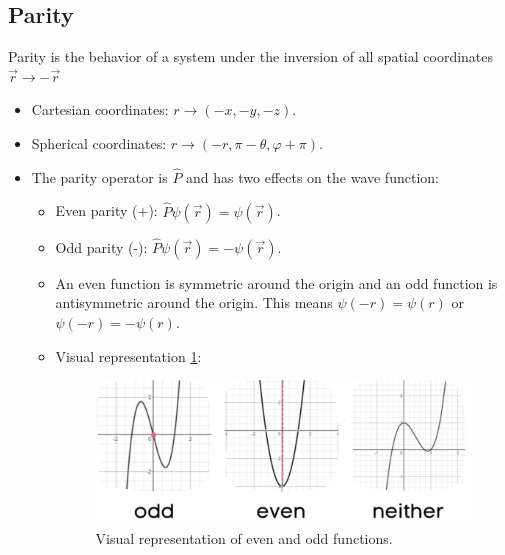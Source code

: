 \subsection{Parity}
Parity is the behavior of a system under the inversion of all spatial coordinates $\vec{r} → - \vec{r}$
\begin{itemize}
    \item Cartesian coordinates: $r → (-x, -y, -z)$. 
    \item Spherical coordinates: $r → (-r, π-θ, φ + π)$.
    \item The parity operator is $\hat{P}$ and has two effects on the wave function: 
    \begin{itemize}
        \item Even parity (+): $\hat{P}ψ(\vec{r}) = ψ(\vec{r})$.
        \item Odd parity (-): $\hat{P}ψ(\vec{r}) = -ψ(\vec{r})$.
        \item An even function is symmetric around the origin and an odd function is antisymmetric around the origin. This means $ψ(-r) = ψ(r)$ or $ψ(-r) = -ψ(r)$. 
        \item Visual representation \cref{fig: even_vs_odd_function}:
        \begin{figure}[h!]
        \centering
        \includegraphics[width = .75\textwidth]{even_vs_odd_function.png}
        \caption{Visual representation of even and odd functions.}
        \label{fig: even_vs_odd_function}
        \end{figure}
    \end{itemize} 
\end{itemize}
